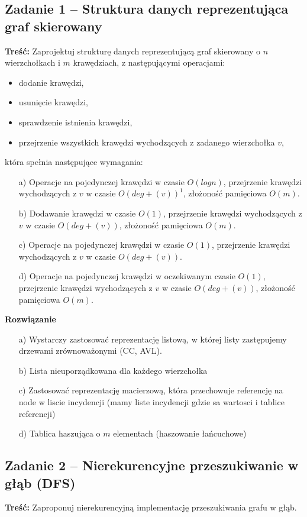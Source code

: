 \subsection{Zadanie 1 -- Struktura danych reprezentująca graf skierowany}

\textbf{Treść:} Zaprojektuj strukturę danych reprezentującą graf skierowany o $n$ wierzchołkach i $m$ krawędziach, z
następującymi operacjami:
\begin{itemize}
	\item dodanie krawędzi,
	\item usunięcie krawędzi,
	\item sprawdzenie istnienia krawędzi,
	\item przejrzenie wszystkich krawędzi wychodzących z zadanego wierzchołka $v$,
\end{itemize}
która spełnia następujące wymagania:
\begin{itemize}
	\item[a)] Operacje na pojedynczej krawędzi w czasie $O(log n)$, przejrzenie krawędzi wychodzących z $v$ w czasie $O(deg+(v))^1$,
	złożoność pamięciowa $O(m)$.
	\item[b)] Dodawanie krawędzi w czasie $O(1)$, przejrzenie krawędzi wychodzących z $v$ w czasie $O(deg+(v))$, złożoność
	pamięciowa $O(m)$.
	\item[c)] Operacje na pojedynczej krawędzi w czasie $O(1)$, przejrzenie krawędzi wychodzących z $v$ w czasie $O(deg+(v))$.
	\item[d)] Operacje na pojedynczej krawędzi w oczekiwanym czasie $O(1)$, przejrzenie krawędzi wychodzących z $v$ w czasie
	$O(deg+(v))$, złożoność pamięciowa $O(m)$.
\end{itemize}

\textbf{Rozwiązanie}
\begin{itemize}
	\item[a)] Wystarczy zastosować reprezentację listową, w której 
	listy zastępujemy drzewami zrównoważonymi (CC, AVL).
	\item[b)] Lista nieuporządkowana dla każdego wierzchołka
	\item[c)] Zastosować reprezentację macierzową, która przechowuje
	referencję na node w liscie incydencji (mamy liste incydencji
	gdzie sa wartosci i tablice referencji)
	\item[d)] Tablica haszująca o $m$ elementach (haszowanie łańcuchowe)
\end{itemize}

\subsection{Zadanie 2 -- Nierekurencyjne przeszukiwanie w głąb (DFS)}
\textbf{Treść: } Zaproponuj nierekurencyjną implementację
przeszukiwania grafu w głąb.

